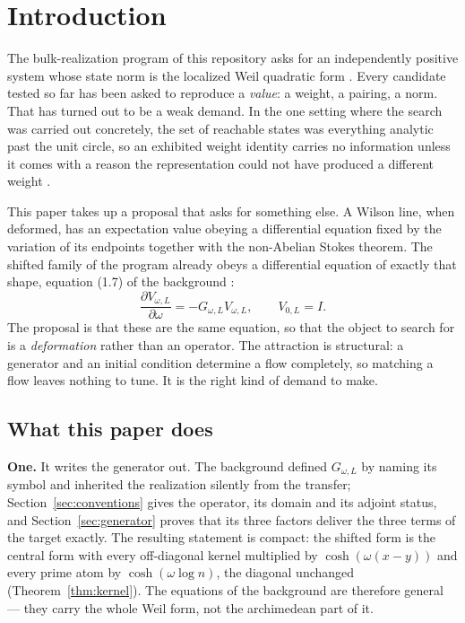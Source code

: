 \section{Introduction}\label{sec:intro}

The bulk-realization program of this repository asks for an independently
positive system whose state norm is the localized Weil quadratic form
\cite{InverseBulk}. Every candidate tested so far has been asked to reproduce a
\emph{value}: a weight, a pairing, a norm. That has turned out to be a weak
demand. In the one setting where the search was carried out concretely, the set
of reachable states was everything analytic past the unit circle, so an exhibited
weight identity carries no information unless it comes with a reason the
representation could not have produced a different weight \cite{Bottleneck}.

This paper takes up a proposal that asks for something else. A Wilson line, when
deformed, has an expectation value obeying a differential equation fixed by the
variation of its endpoints together with the non-Abelian Stokes theorem. The
shifted family of the program already obeys a differential equation of exactly
that shape, equation (1.7) of the background \cite{Background}:
\[
\frac{\partial V_{\omega,L}}{\partial\omega}=-G_{\omega,L}V_{\omega,L},
\qquad V_{0,L}=I .
\]
The proposal is that these are the same equation, so that the object to search
for is a \emph{deformation} rather than an operator. The attraction is
structural: a generator and an initial condition determine a flow completely, so
matching a flow leaves nothing to tune. It is the right kind of demand to make.

\subsection*{What this paper does}

\textbf{One.} It writes the generator out. The background defined $G_{\omega,L}$
by naming its symbol and inherited the realization silently from the transfer;
Section~\ref{sec:conventions} gives the operator, its domain and its adjoint
status, and Section~\ref{sec:generator} proves that its three factors deliver the
three terms of the target exactly. The resulting statement is compact: the
shifted form is the central form with every off-diagonal kernel multiplied by
$\cosh(\omega(x-y))$ and every prime atom by $\cosh(\omega\log n)$, the diagonal
unchanged (Theorem~\ref{thm:kernel}). The equations of the background are
therefore general --- they carry the whole Weil form, not the archimedean part of
it.


